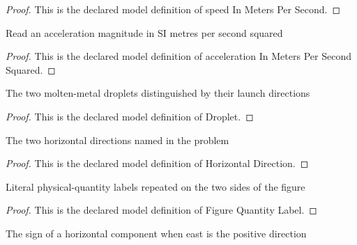 \begin{proof}
  This is the declared model definition of speed In Meters Per Second.
\end{proof}
\begin{definition}
  \label{def:physics:phyx-mini-0691:phyxminiproblems-problemphyxmini0691-accelerationinmeterspersecondsquared}
  Read an acceleration magnitude in SI metres per second squared
\end{definition}
\begin{proof}
  This is the declared model definition of acceleration In Meters Per Second Squared.
\end{proof}
\begin{definition}[Droplet]
  \label{def:physics:phyx-mini-0691:phyxminiproblems-problemphyxmini0691-droplet}
  The two molten-metal droplets distinguished by their launch directions
\end{definition}
\begin{proof}
  This is the declared model definition of Droplet.
\end{proof}
\begin{definition}
  \label{def:physics:phyx-mini-0691:phyxminiproblems-problemphyxmini0691-horizontaldirection}
  The two horizontal directions named in the problem
\end{definition}
\begin{proof}
  This is the declared model definition of Horizontal Direction.
\end{proof}
\begin{definition}
  \label{def:physics:phyx-mini-0691:phyxminiproblems-problemphyxmini0691-figurequantitylabel}
  Literal physical-quantity labels repeated on the two sides of the figure
\end{definition}
\begin{proof}
  This is the declared model definition of Figure Quantity Label.
\end{proof}
\begin{definition}[sign]
  \label{def:physics:phyx-mini-0691:phyxminiproblems-problemphyxmini0691-horizontaldirection-sign}
  The sign of a horizontal component when east is the positive direction
\end{definition}

